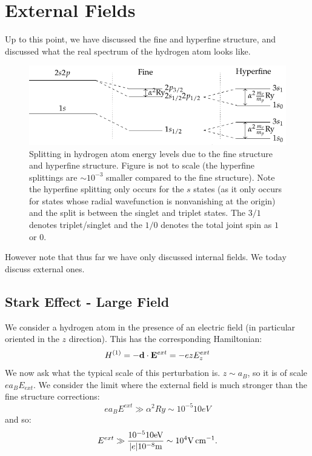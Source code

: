 \section{External Fields}
Up to this point, we have discussed the fine and hyperfine structure, and discussed what the real spectrum of the hydrogen atom looks like.

\begin{figure}[htbp]
    \centering
    \includegraphics[]{Images/fig-hyperfinestructuresplit.pdf}

    \caption{Splitting in hydrogen atom energy levels due to the fine structure and hyperfine structure. Figure is not to scale (the hyperfine splittings are $\sim 10^{-3}$ smaller compared to the fine structure). Note the hyperfine splitting only occurs for the $s$ states (as it only occurs for states whose radial wavefunction is nonvanishing at the origin) and the split is between the singlet and triplet states. The $3/1$ denotes triplet/singlet and the $1/0$ denotes the total joint spin as $1$ or $0$.}
    \label{fig-hyperfinestructuresplit}
\end{figure}

However note that thus far we have only discussed internal fields. We today discuss external ones.

\subsection{Stark Effect - Large Field}
We consider a hydrogen atom in the presence of an electric field (in particular oriented in the $z$ direction). This has the corresponding Hamiltonian:
\begin{equation}
    H^{(1)} = -\v{d} \cdot \v{E}^{ext} = -ezE_z^{ext}
\end{equation}
We now ask what the typical scale of this perturbation is. $z \sim a_B$, so it is of scale $e a_B E_{ext}$. We consider the limit where the external field is much stronger than the fine structure corrections:
\begin{equation}
    e a_B E^{ext} \gg \alpha^2 \si{Ry} \sim 10^{-5} 10 \si{eV}
\end{equation}
and so:
\begin{equation}
    E^{ext} \gg \frac{ 10^{-5} 10 \si{eV}}{\abs{e}10^{-8}\si{m}} \sim 10^{4}\si{V.cm^{-1}}.
\end{equation}

